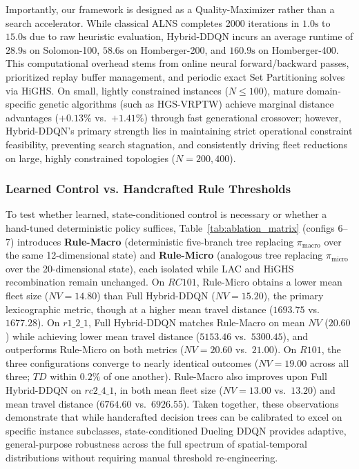 Importantly, our framework is designed as a Quality-Maximizer rather than a search accelerator. While classical ALNS completes 2000 iterations in $1.0\text{s}$ to $15.0\text{s}$ due to raw heuristic evaluation, Hybrid-DDQN incurs an average runtime of $28.9\text{s}$ on Solomon-100, $58.6\text{s}$ on Homberger-200, and $160.9\text{s}$ on Homberger-400. This computational overhead stems from online neural forward/backward passes, prioritized replay buffer management, and periodic exact Set Partitioning solves via HiGHS. On small, lightly constrained instances ($N \le 100$), mature domain-specific genetic algorithms (such as HGS-VRPTW) achieve marginal distance advantages ($+0.13\%$ vs.\ $+1.41\%$) through fast generational crossover; however, Hybrid-DDQN's primary strength lies in maintaining strict operational constraint feasibility, preventing search stagnation, and consistently driving fleet reductions on large, highly constrained topologies ($N=200, 400$).

\subsubsection{Learned Control vs. Handcrafted Rule Thresholds}
\label{sec:disc_rule_vs_learned}
To test whether learned, state-conditioned control is necessary or whether a hand-tuned deterministic policy suffices, Table~\ref{tab:ablation_matrix} (configs 6--7) introduces \textbf{Rule-Macro} (deterministic five-branch tree replacing $\pi_{\text{macro}}$ over the same 12-dimensional state) and \textbf{Rule-Micro} (analogous tree replacing $\pi_{\text{micro}}$ over the 20-dimensional state), each isolated while LAC and HiGHS recombination remain unchanged. On $RC101$, Rule-Micro obtains a lower mean fleet size ($NV=14.80$) than Full Hybrid-DDQN ($NV=15.20$), the primary lexicographic metric, though at a higher mean travel distance ($1693.75$ vs.\ $1677.28$). On $r1\_2\_1$, Full Hybrid-DDQN matches Rule-Macro on mean $NV$ ($20.60$) while achieving lower mean travel distance ($5153.46$ vs.\ $5300.45$), and outperforms Rule-Micro on both metrics ($NV=20.60$ vs.\ $21.00$). On $R101$, the three configurations converge to nearly identical outcomes ($NV=19.00$ across all three; $TD$ within $0.2\%$ of one another). Rule-Macro also improves upon Full Hybrid-DDQN on $rc2\_4\_1$, in both mean fleet size ($NV=13.00$ vs.\ $13.20$) and mean travel distance ($6764.60$ vs.\ $6926.55$). Taken together, these observations demonstrate that while handcrafted decision trees can be calibrated to excel on specific instance subclasses, state-conditioned Dueling DDQN provides adaptive, general-purpose robustness across the full spectrum of spatial-temporal distributions without requiring manual threshold re-engineering.

